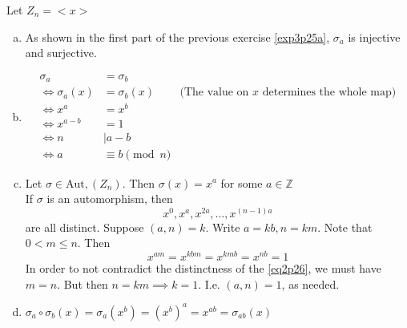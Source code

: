\documentclass{article}
\newcommand{\ints}{\mathbb{Z}}
\newcommand{\comp}{ \circ }
\newcommand{\Aut}{ \textrm{Aut}, }
\newcommand{\divides}{\vert}
\newcommand{\cyclic}[1]{<#1>}
\begin{document}
\subsubsection{}\label{ex3p26}
Let $Z_n = \cyclic{x}$
\begin{enumerate}[(a)]
\item As shown in the first part of the previous exercise \ref{exp3p25a}, $\sigma_a$ is injective and surjective.
\item 
\begin{align*}
\sigma_a &= \sigma_b\\
\iff \sigma_a(x) &= \sigma_b(x) & \mbox{(The value on $x$ determines the whole map)}\\
\iff x^a &= x^b\\
\iff x^{a-b} &= 1\\
\iff n &\divides a-b\\
\iff a &\equiv b \pmod{n}
\end{align*}
\item
Let $\sigma \in \Aut(Z_n)$. Then $\sigma(x) = x^a$ for some $a \in \ints$\\
If $\sigma$ is an automorphism, then
\begin{equation}
x^0, x^a, x^{2a},\ldots, x^{(n-1)a} \label{eq2p26}
\end{equation}
are all distinct. Suppose $(a,n)=k$. Write $a=kb,n=km$. Note that $0<m\leq n$. Then\\
\begin{equation}
x^{am} = x^{kbm} = x^{kmb} = x^{nb} = 1
\end{equation}
In order to not contradict the distinctness of the \ref{eq2p26}, we must have $m=n$. But then $n=km \implies k=1$. I.e. $(a,n)=1$, as needed.
\item
$\sigma_a\comp\sigma_b(x) = \sigma_a(x^b) = (x^b)^a = x^{ab} = \sigma_{ab}(x)$
\end{enumerate}
\end{document}
